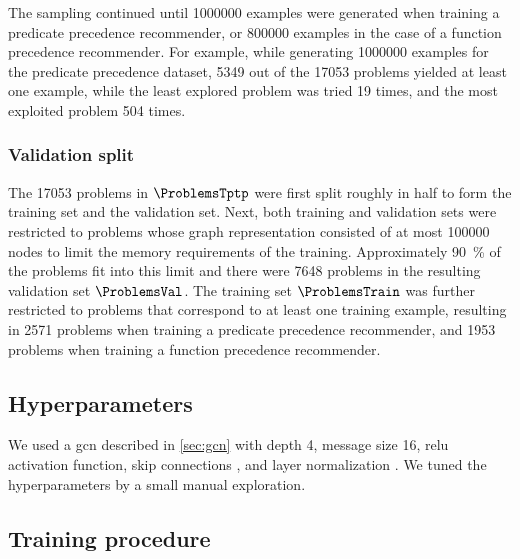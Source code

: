 The sampling continued until \num{1000000} examples were generated when training a predicate precedence recommender,
or \num{800000} examples in the case of a function precedence recommender.
For example, while generating \num{1000000} examples for the predicate precedence dataset,
\num{5349} out of the \num{17053} problems yielded at least one example,
while the least explored problem was tried 19 times, and the most exploited problem 504 times.

\subsubsection{Validation split}

The \num{17053} problems in $\ProblemsTptp$ were first split roughly in half to form the training set and the validation set.
Next, both training and validation sets were restricted
to problems whose graph representation consisted of at most \num{100000} nodes
to limit the memory requirements of the training.
Approximately \SI{90}{\percent} of the problems fit into this limit
and there were \num{7648} problems in the resulting validation set $\ProblemsVal$.
The training set $\ProblemsTrain$ was further restricted to problems that correspond to at least one training example,
resulting in \num{2571} problems when training a predicate precedence recommender,
and \num{1953} problems when training a function precedence recommender.

\subsection{Hyperparameters}

We used a \gls{gcn} described in \cref{sec:gcn}
with depth 4, message size 16, \gls{relu} activation function,
skip connections \cite{Zhou2018}, and layer normalization \cite{Ba2016}.
We tuned the hyperparameters by a small manual exploration.

\subsection{Training procedure}

